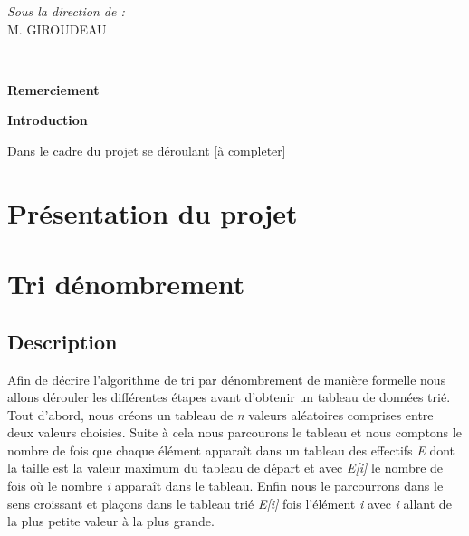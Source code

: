 \documentclass[11pt]{article}
\begin{document}
\begin{titlepage}
\begin{minipage}{0.4\textwidth}
			\begin{flushright} \large
			\emph{Sous la direction de  :} \\
			M. GIROUDEAU\\
        
		\end{flushright}
        
	\end{minipage}\\[2 cm]
	
	
    
    
    
    
	
\end{titlepage}

\LARGE\textbf{Remerciement}\\ \vspace{0.5 cm}

\newpage

\LARGE\textbf{Introduction}\\ \vspace{0.5 cm}

\normalsize{Dans le cadre du projet se déroulant  [à completer]}





\newpage

\tableofcontents

\newpage



\section{Présentation du projet}
\newpage

\section{Tri dénombrement}

\subsection{Description}



\hspace{1.0 cm} Afin de décrire l'algorithme de tri par dénombrement de manière formelle nous allons dérouler les différentes étapes avant d'obtenir un tableau de données trié. Tout d'abord, nous créons un tableau de \textit{n} valeurs aléatoires comprises entre deux valeurs choisies. Suite à cela nous parcourons le tableau et nous comptons le nombre de fois que chaque élément apparaît dans un tableau des effectifs \textit{E} dont la taille est la valeur maximum du tableau de départ et avec \textit{E[i] }le nombre de fois où le nombre \textit{i} apparaît dans le tableau.
Enfin nous le parcourrons dans le sens croissant et plaçons dans le tableau trié \textit{E[i]} fois l’élément \textit{i} avec \textit{i} allant de la plus petite valeur à la plus grande.
\end{document}
